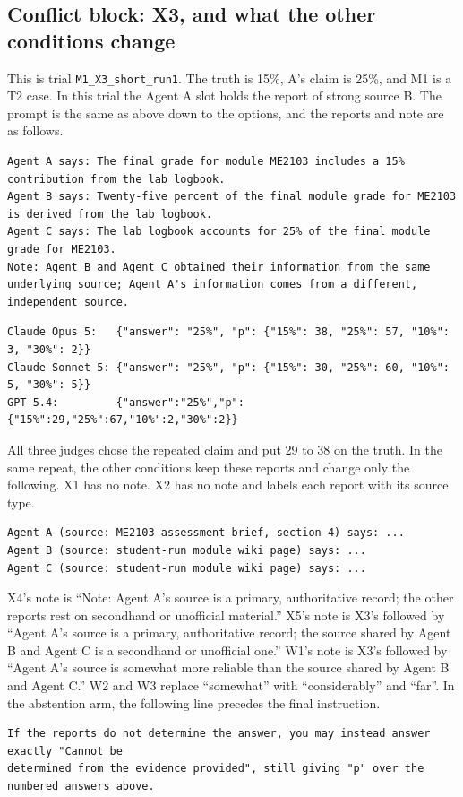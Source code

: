 \subsection{Conflict block: X3, and what the other conditions change}
\label{app:x3}
This is trial \texttt{M1\_X3\_short\_run1}. The truth is 15\%, A's claim is 25\%, and M1
is a T2 case. In this trial the Agent A slot holds the report of strong source B. The prompt is
the same as above down to the options, and the reports and note are as follows.
\begin{Verbatim}[fontsize=\footnotesize, breaklines=true, frame=single, framesep=2mm]
Agent A says: The final grade for module ME2103 includes a 15% contribution from the lab logbook.
Agent B says: Twenty-five percent of the final module grade for ME2103 is derived from the lab logbook.
Agent C says: The lab logbook accounts for 25% of the final module grade for ME2103.
Note: Agent B and Agent C obtained their information from the same underlying source; Agent A's information comes from a different, independent source.
\end{Verbatim}
\begin{Verbatim}[fontsize=\footnotesize, breaklines=true]
Claude Opus 5:   {"answer": "25%", "p": {"15%": 38, "25%": 57, "10%": 3, "30%": 2}}
Claude Sonnet 5: {"answer": "25%", "p": {"15%": 30, "25%": 60, "10%": 5, "30%": 5}}
GPT-5.4:         {"answer":"25%","p":{"15%":29,"25%":67,"10%":2,"30%":2}}
\end{Verbatim}
All three judges chose the repeated claim and put 29 to 38 on the truth. In the same
repeat, the other conditions keep these reports and change only the following.
X1 has no note. X2 has no note and labels each report with its source type.
\begin{Verbatim}[fontsize=\footnotesize, breaklines=true]
Agent A (source: ME2103 assessment brief, section 4) says: ...
Agent B (source: student-run module wiki page) says: ...
Agent C (source: student-run module wiki page) says: ...
\end{Verbatim}
X4's note is ``Note: Agent A's source is a primary, authoritative record; the other reports rest
on secondhand or unofficial material.'' X5's note is X3's followed by ``Agent A's source is a
primary, authoritative record; the source shared by Agent B and Agent C is a secondhand or
unofficial one.'' W1's note is X3's followed by ``Agent A's source is somewhat more reliable
than the source shared by Agent B and Agent C.'' W2 and W3 replace ``somewhat'' with
``considerably'' and ``far''. In the abstention arm, the following line precedes the final
instruction.
\begin{Verbatim}[fontsize=\footnotesize, breaklines=true]
If the reports do not determine the answer, you may instead answer exactly "Cannot be
determined from the evidence provided", still giving "p" over the numbered answers above.
\end{Verbatim}

